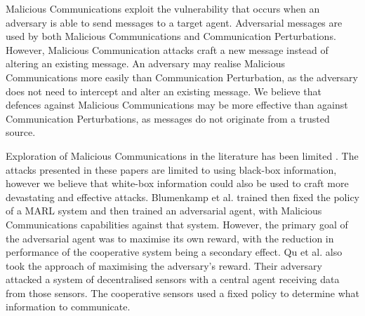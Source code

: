 \documentclass[conference,compsoc]{IEEEtran}
\begin{document}
Malicious Communications exploit the vulnerability that occurs when an adversary is able to send messages to a target agent. Adversarial messages are used by both Malicious Communications and Communication Perturbations. However, Malicious Communication attacks craft a new message instead of altering an existing message. An adversary may realise Malicious Communications more easily than Communication Perturbation, as the adversary does not need to intercept and alter an existing message. We believe that defences against Malicious Communications may be more effective than against Communication Perturbations, as  messages do not originate from a trusted source.

Exploration of Malicious Communications in the literature has been limited \cite{blumenkamp_emergence_2021, qu_attacking_2021}. The attacks presented in these papers are limited to using black-box information, however we believe that white-box information could also be used to craft more devastating and effective attacks. Blumenkamp et al. \cite{blumenkamp_emergence_2021} trained then fixed the policy of a MARL system and then trained an adversarial agent, with Malicious Communications capabilities against that system. However, the primary goal of the adversarial agent was to maximise its own reward, with the reduction in performance of the cooperative system being a secondary effect. Qu et al. \cite{qu_attacking_2021} also took the approach of maximising the adversary's reward. Their adversary attacked a system of decentralised sensors with a central agent receiving data from those sensors. The cooperative sensors used a fixed policy to determine what information to communicate.

\end{document}
